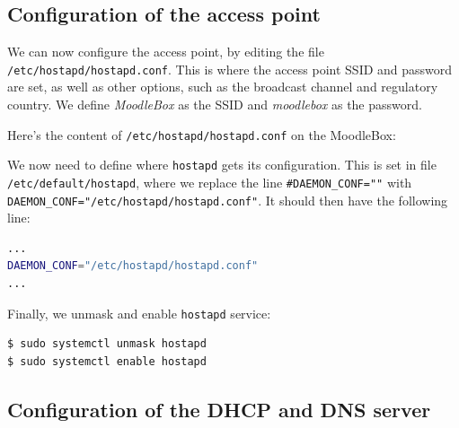 \documentclass[12pt]{article}
\begin{document}
\subsection{Configuration of the access point}

We can now configure the access point, by editing the file \lstinline{/etc/hostapd/hostapd.conf}.
This is where the access point SSID and password are set, as well as other options, such as the broadcast channel and regulatory country.
We define \emph{MoodleBox} as the SSID and \emph{moodlebox} as the password.

Here's the content of \lstinline{/etc/hostapd/hostapd.conf} on the MoodleBox:

We now need to define where \lstinline{hostapd} gets its configuration.
This is set in file \lstinline{/etc/default/hostapd}, where we replace the line \lstinline{#DAEMON_CONF=""} with \lstinline{DAEMON_CONF="/etc/hostapd/hostapd.conf"}.
It should then have the following line:
\begin{lstlisting}[language=bash]
...
DAEMON_CONF="/etc/hostapd/hostapd.conf"
...
\end{lstlisting}

Finally, we unmask and enable \lstinline{hostapd} service:
\begin{lstlisting}[language=bash]
$ sudo systemctl unmask hostapd
$ sudo systemctl enable hostapd
\end{lstlisting}

\subsection{Configuration of the DHCP and DNS server}
\end{document}

